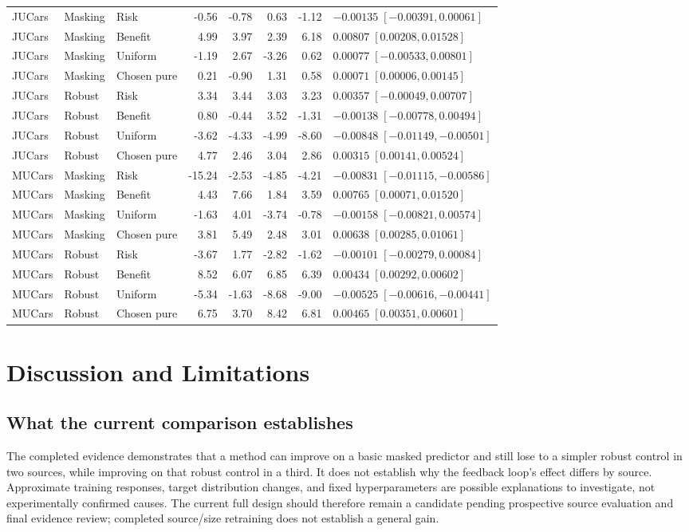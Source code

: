 \documentclass[10pt,journal]{IEEEtran}
\begin{document}
\begin{table}[t]
\begin{tabular}{lllrrrrl}
JUCars & Masking & Risk & -0.56 & -0.78 & 0.63 & -1.12 & $-0.00135\;[-0.00391,0.00061]$\\
JUCars & Masking & Benefit & 4.99 & 3.97 & 2.39 & 6.18 & $0.00807\;[0.00208,0.01528]$\\
JUCars & Masking & Uniform & -1.19 & 2.67 & -3.26 & 0.62 & $0.00077\;[-0.00533,0.00801]$\\
JUCars & Masking & Chosen pure & 0.21 & -0.90 & 1.31 & 0.58 & $0.00071\;[0.00006,0.00145]$\\
JUCars & Robust & Risk & 3.34 & 3.44 & 3.03 & 3.23 & $0.00357\;[-0.00049,0.00707]$\\
JUCars & Robust & Benefit & 0.80 & -0.44 & 3.52 & -1.31 & $-0.00138\;[-0.00778,0.00494]$\\
JUCars & Robust & Uniform & -3.62 & -4.33 & -4.99 & -8.60 & $-0.00848\;[-0.01149,-0.00501]$\\
JUCars & Robust & Chosen pure & 4.77 & 2.46 & 3.04 & 2.86 & $0.00315\;[0.00141,0.00524]$\\
MUCars & Masking & Risk & -15.24 & -2.53 & -4.85 & -4.21 & $-0.00831\;[-0.01115,-0.00586]$\\
MUCars & Masking & Benefit & 4.43 & 7.66 & 1.84 & 3.59 & $0.00765\;[0.00071,0.01520]$\\
MUCars & Masking & Uniform & -1.63 & 4.01 & -3.74 & -0.78 & $-0.00158\;[-0.00821,0.00574]$\\
MUCars & Masking & Chosen pure & 3.81 & 5.49 & 2.48 & 3.01 & $0.00638\;[0.00285,0.01061]$\\
MUCars & Robust & Risk & -3.67 & 1.77 & -2.82 & -1.62 & $-0.00101\;[-0.00279,0.00084]$\\
MUCars & Robust & Benefit & 8.52 & 6.07 & 6.85 & 6.39 & $0.00434\;[0.00292,0.00602]$\\
MUCars & Robust & Uniform & -5.34 & -1.63 & -8.68 & -9.00 & $-0.00525\;[-0.00616,-0.00441]$\\
MUCars & Robust & Chosen pure & 6.75 & 3.70 & 8.42 & 6.81 & $0.00465\;[0.00351,0.00601]$\\
\bottomrule
\end{tabular}
\end{table}


\section{Discussion and Limitations}
\subsection{What the current comparison establishes}
The completed evidence demonstrates that a method can improve on a basic
masked predictor and still lose to a simpler robust control in two sources,
while improving on that robust control in a third. It does not establish
why the feedback loop's effect differs by source. Approximate training
responses, target distribution changes, and fixed hyperparameters are
possible explanations to investigate, not experimentally confirmed
causes. The current full design should therefore remain a candidate
pending prospective source evaluation and final evidence review; completed
source/size retraining does not establish a general gain.
\end{document}
